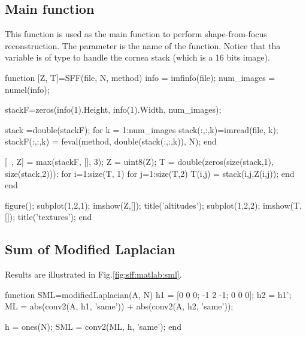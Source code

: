 \def\QRCODE{MASTER_mispa_TUT.IMG.shape_from_focus_matlabqrcode.png}
\def\QRPAGE{http://www.iptutorials.science/tree/master/MASTER_mispa/TUT.IMG.shape_from_focus/matlab}

\subsection{Main function}
This function is used as the main function to perform shape-from-focus reconstruction. The parameter  is the name of the function. Notice that tha variable  is of type  to handle the cornea stack (which is a 16 bits image).

\begin{matlab}
function [Z, T]=SFF(file, N, method)
%
info = imfinfo(file);
num_images = numel(info);

stackF=zeros(info(1).Height, info(1).Width, num_images);

stack =double(stackF);
for k = 1:num_images
    stack(:,:,k)=imread(file, k);
    stackF(:,:,k) = feval(method, double(stack(:,:,k)), N);
end

[~, Z] = max(stackF, [], 3);
Z = uint8(Z);
T = double(zeros(size(stack,1), size(stack,2)));
for i=1:size(T, 1)
    for j=1:size(T,2)
        T(i,j) = stack(i,j,Z(i,j));
    end
end

figure();
subplot(1,2,1); imshow(Z,[]); title('altitudes');
subplot(1,2,2); imshow(T,[]); title('textures');
end
\end{matlab}


\subsection{Sum of Modified Laplacian}
Results are illustrated in Fig.\ref{fig:sff:matlab:sml}.

\begin{matlab}
function SML=modifiedLaplacian(A, N)
     h1 = [0 0 0; -1 2 -1; 0 0 0];
     h2 = h1';
     ML = abs(conv2(A, h1, 'same')) + abs(conv2(A, h2, 'same'));
        
     h = ones(N);
     SML = conv2(ML, h, 'same');
end
\end{matlab}

